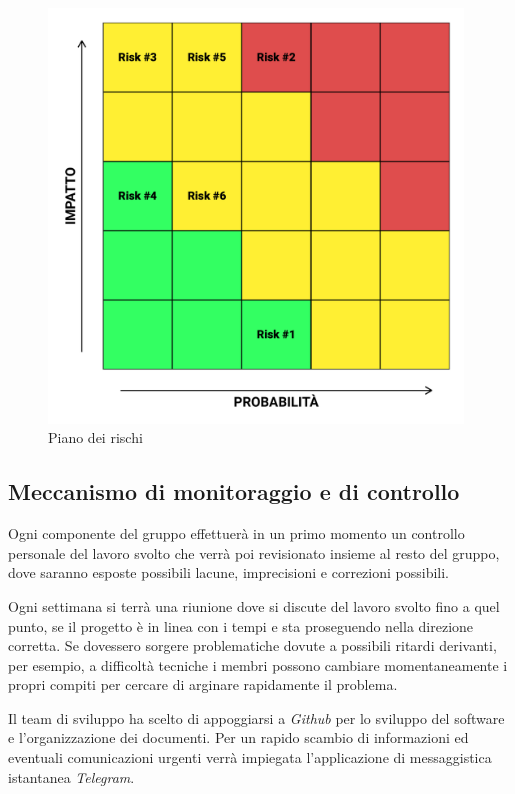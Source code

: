 \documentclass{article}
\begin{document}
\begin{figure}[htbp]
\centering
\includegraphics[width=11cm]{gfx/Quadrati_rischi.pdf}
\caption{Piano dei rischi}
\end{figure}

\subsection{Meccanismo di monitoraggio e di
controllo}

Ogni componente del gruppo effettuerà in un primo momento un controllo
personale del lavoro svolto che verrà poi revisionato insieme al resto
del gruppo, dove saranno esposte possibili lacune, imprecisioni e
correzioni possibili.

Ogni settimana si terrà una riunione dove si discute del lavoro svolto
fino a quel punto, se il progetto è in linea con i tempi e sta
proseguendo nella direzione corretta. Se dovessero sorgere problematiche dovute a possibili ritardi derivanti, per esempio, a difficoltà tecniche i membri possono cambiare momentaneamente i propri compiti per cercare di arginare rapidamente il problema.

Il team di sviluppo ha scelto di appoggiarsi a \emph{Github} per lo sviluppo del software e l'organizzazione dei documenti. Per un rapido scambio di informazioni ed eventuali comunicazioni urgenti verrà impiegata l'applicazione di messaggistica istantanea \emph{Telegram}.
\end{document}
